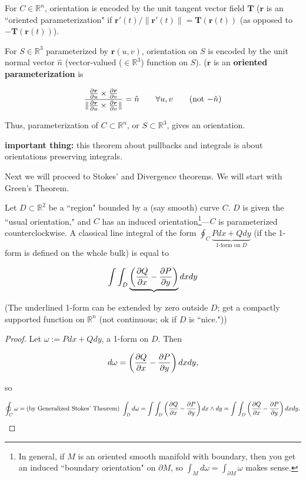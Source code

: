 For \(C \in \mathbb{R}^n\), orientation is encoded by the unit tangent vector field \(\boldsymbol{T}\) (\(\boldsymbol{r}\) is an ``oriented parameterization" if \(\boldsymbol{r}'(t)/\lVert \boldsymbol{r}'(t) \rVert = \boldsymbol{T}(\boldsymbol{r}(t))\) (as opposed to \(-\boldsymbol{T}(\boldsymbol{r}(t))\)).

For \(S \in \mathbb{R}^3\) parameterized by \(\boldsymbol{r}(u,v)\), orientation on \(S\) is encoded by the unit normal vector \(\hat{n}\) (vector-valued (\(\in \mathbb{R}^3\)) function on \(S\)). (\(\boldsymbol{r}\) is an \textbf{oriented parameterization} is 

\[
\frac{\pderiv{\boldsymbol{r}}{u} \times \pderiv{\boldsymbol{r}}{v}}{\lVert \pderiv{\boldsymbol{r}}{u} \times \pderiv{\boldsymbol{r}}{v} \rVert} = \hat{n} \qquad \forall u, v \qquad \text{(not \(-\hat{n}\))}
\]

Thus, parameterization of \(C \subset \mathbb{R}^n\), or \(S \subset \mathbb{R}^3\), gives an orientation.

\textbf{important thing:} this theorem about pullbacks and integrals is about orientations preserving integrals.

Next we will proceed to Stokes' and Divergence theorems. We will start with Green's Theorem.

\begin{theorem}

Let \(D \subset \mathbb{R}^2\) be a ``region" bounded by a (say smooth) curve \(C\). \(D\) is given the ``usual orientation," and \(C\) has an induced orientation\footnote{In general, if \(M\) is an oriented smooth manifold with boundary, then you get an induced ``boundary orientation" on \(\partial M\), so \(\int_M d \omega = \int_{\partial M} \omega\) makes sense.}---\(C\) is parameterized counterclockwise. A classical line integral of the form \(\oint_C \underbrace{P dx + Q dy}_{\text{1-form on } D}\) (if the 1-form is defined on the whole bulk) is equal to 

\[
\int \int_D \underbrace{\left( \pderiv{Q}{x} - \pderiv{P}{y} \right)} dx dy
\]

(The underlined 1-form can be extended by zero outside \(D\); get a compactly supported function on \(\mathbb{R}^n\) (not continuous; ok if \(D\) is ``nice."))

\end{theorem}

\begin{proof}

Let \(\omega := P dx + Q dy\), a 1-form on \(D\). Then

\[
d\omega = \left( \pderiv{Q}{x} - \pderiv{P}{y} \right)dx dy,
\]

so

\[
\oint_C \omega = \text{(by Generalized Stokes' Theorem) } \int_D d \omega = \int \int _D \left(\pderiv{Q}{x} - \pderiv{P}{y} \right)dx \wedge dy = \int \int_D \left( \pderiv{Q}{x} - \pderiv{P}{y} \right) dx dy.
\]

\end{proof}

